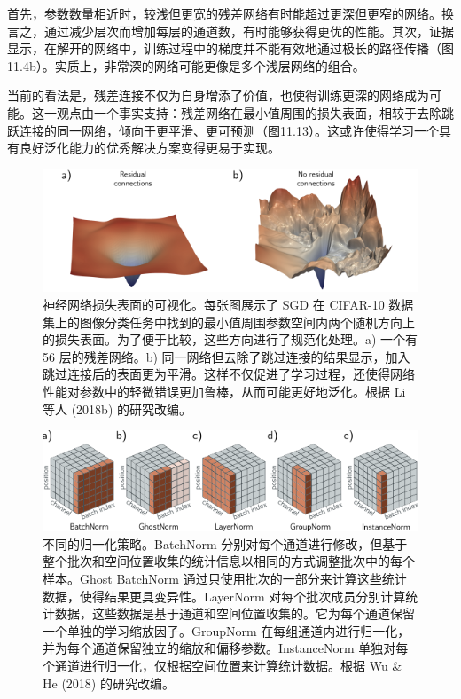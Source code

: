 首先，参数数量相近时，较浅但更宽的残差网络有时能超过更深但更窄的网络。换言之，通过减少层次而增加每层的通道数，有时能够获得更优的性能。其次，证据显示，在解开的网络中，训练过程中的梯度并不能有效地通过极长的路径传播（图11.4b）。实质上，非常深的网络可能更像是多个浅层网络的组合。

当前的看法是，残差连接不仅为自身增添了价值，也使得训练更深的网络成为可能。这一观点由一个事实支持：残差网络在最小值周围的损失表面，相较于去除跳跃连接的同一网络，倾向于更平滑、更可预测（图11.13）。这或许使得学习一个具有良好泛化能力的优秀解决方案变得更易于实现。

\begin{figure}[ht!]
\centering
\includegraphics[width=0.7\linewidth]{png/chapter11/ResidualSurface.png}
\caption{神经网络损失表面的可视化。每张图展示了 SGD 在 CIFAR-10 数据集上的图像分类任务中找到的最小值周围参数空间内两个随机方向上的损失表面。为了便于比较，这些方向进行了规范化处理。a) 一个有 56 层的残差网络。b) 同一网络但去除了跳过连接的结果显示，加入跳过连接后的表面更为平滑。这样不仅促进了学习过程，还使得网络性能对参数中的轻微错误更加鲁棒，从而可能更好地泛化。根据 Li 等人 (2018b) 的研究改编。}
\end{figure}


\begin{figure}[ht!]
\centering
\includegraphics[width=0.7\linewidth]{png/chapter11/ResidualNormTypes.png}
\caption{不同的归一化策略。BatchNorm 分别对每个通道进行修改，但基于整个批次和空间位置收集的统计信息以相同的方式调整批次中的每个样本。Ghost BatchNorm 通过只使用批次的一部分来计算这些统计数据，使得结果更具变异性。LayerNorm 对每个批次成员分别计算统计数据，这些数据是基于通道和空间位置收集的。它为每个通道保留一个单独的学习缩放因子。GroupNorm 在每组通道内进行归一化，并为每个通道保留独立的缩放和偏移参数。InstanceNorm 单独对每个通道进行归一化，仅根据空间位置来计算统计数据。根据 Wu \& He (2018) 的研究改编。}
\end{figure}



